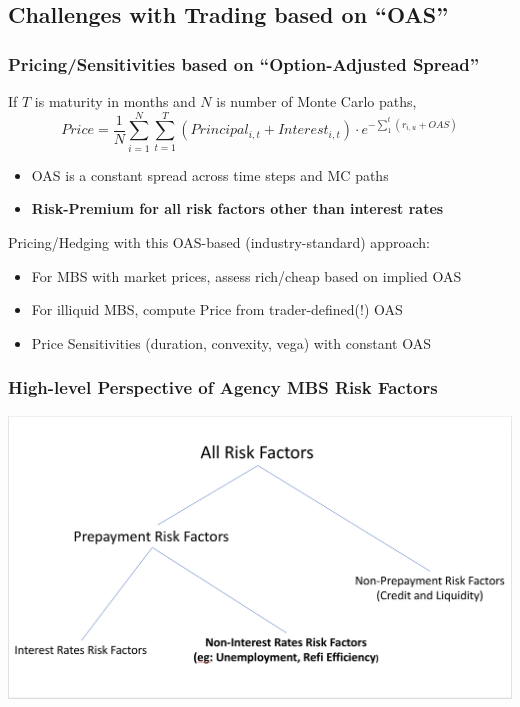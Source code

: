 \documentclass{beamer}
\begin{document}
\subsection{Challenges with Trading based on ``OAS''}
\begin{frame}
\frametitle{Pricing/Sensitivities based on ``Option-Adjusted Spread''}
If $T$ is maturity in months and $N$ is number of Monte Carlo paths, 
$$Price = \frac 1 N \sum_{i=1}^N \sum_{t=1}^T (Principal_{i,t} + Interest_{i,t}) \cdot e^{-\sum_1^t (r_{i,u} + OAS)}$$
\begin{itemize}
\item OAS is a constant spread across time steps and MC paths
\item {\bf Risk-Premium for all risk factors other than interest rates}
\end{itemize}

Pricing/Hedging with this OAS-based (industry-standard) approach:
\begin{itemize}
\item For MBS with market prices, assess rich/cheap based on implied OAS
\item For illiquid MBS, compute Price from trader-defined(!) OAS
\item Price Sensitivities (duration, convexity, vega) with constant OAS
\end{itemize}

\end{frame}

\begin{frame}
\frametitle{High-level Perspective of Agency MBS Risk Factors}
\includegraphics[scale=0.29]{risk_factors.png}
\end{frame}
\end{document}
